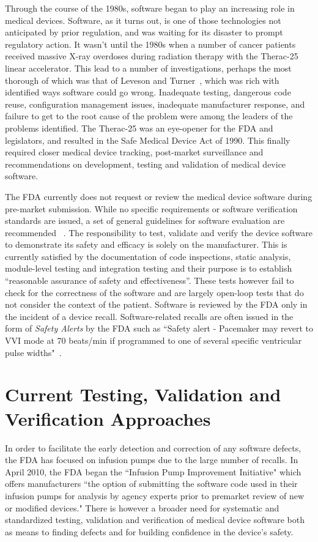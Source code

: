 Through the course of the 1980s, software began to play an increasing role in medical devices. Software, as it turns out, is one of those technologies not anticipated by prior regulation, and was waiting for its disaster to prompt regulatory action. It wasn't until the 1980s when a number of cancer patients received massive X-ray overdoses during radiation therapy with the Therac-25 linear accelerator. This lead to a number of investigations, perhaps the most thorough of which was that of Leveson and Turner~\cite{therac}, which was rich with identified ways software could go wrong. Inadequate testing, dangerous code reuse, configuration management issues, inadequate manufacturer response, and failure to get to the root cause of the problem were among the leaders of the problems identified. The Therac-25 was an eye-opener for the FDA and legislators, and resulted in the Safe Medical Device Act of 1990. This finally required closer medical device tracking, post-market surveillance and recommendations on development, testing and validation of medical device software. 

The FDA currently does not request or review the medical device software during pre-market submission. While no specific requirements or software verification standards are issued, a set of general guidelines for software evaluation are recommended ~\cite{fda1, fda2, fda3}. The responsibility to test, validate and verify the device software to demonstrate its safety and efficacy is solely on the manufacturer. This is currently satisfied by the documentation of code inspections, static analysis, module-level testing and integration testing and their purpose is to establish ``reasonable assurance of safety and effectiveness''. These tests however fail to check for the correctness of the software and are largely open-loop tests that do not consider the context of the patient. Software is reviewed by the FDA only in the incident of a device recall. Software-related recalls are often issued in the form of \emph{Safety Alerts} by the %
FDA such as ``Safety alert - Pacemaker may revert to VVI mode at 70 beats/min if programmed to one of several specific ventricular pulse widths"~\cite{recalls}.

\section{Current Testing, Validation and Verification Approaches}
In order to facilitate the early detection and correction of any software defects, the FDA has focused on infusion pumps due to the large number of recalls. In April 2010, the FDA began the ``Infusion Pump Improvement Initiative" which offers manufacturers ``the option of submitting the software code used in their infusion pumps for analysis by agency experts prior to premarket review of new or modified devices." There is however a broader need for systematic and standardized testing, validation and verification of medical device software both as means to finding defects and for building confidence in the device's safety.	

